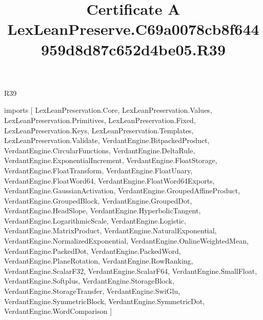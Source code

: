\begin{lexlean}{R39}
\title{Certificate A LexLeanPreserve.C69a0078cb8f644959d8d87c652d4be05.R39}
\begin{coremodule}
imports [
  LexLeanPreservation.Core,
  LexLeanPreservation.Values,
  LexLeanPreservation.Primitives,
  LexLeanPreservation.Fixed,
  LexLeanPreservation.Keys,
  LexLeanPreservation.Templates,
  LexLeanPreservation.Validate,
  VerdantEngine.BitpackedProduct,
  VerdantEngine.CircularFunctions,
  VerdantEngine.DeltaRule,
  VerdantEngine.ExponentialIncrement,
  VerdantEngine.FloatStorage,
  VerdantEngine.FloatTransform,
  VerdantEngine.FloatUnary,
  VerdantEngine.FloatWord64,
  VerdantEngine.FloatWord64Exports,
  VerdantEngine.GaussianActivation,
  VerdantEngine.GroupedAffineProduct,
  VerdantEngine.GroupedBlock,
  VerdantEngine.GroupedDot,
  VerdantEngine.HeadSlope,
  VerdantEngine.HyperbolicTangent,
  VerdantEngine.LogarithmicScale,
  VerdantEngine.Logistic,
  VerdantEngine.MatrixProduct,
  VerdantEngine.NaturalExponential,
  VerdantEngine.NormalizedExponential,
  VerdantEngine.OnlineWeightedMean,
  VerdantEngine.PackedDot,
  VerdantEngine.PackedWord,
  VerdantEngine.PlaneRotation,
  VerdantEngine.RowRanking,
  VerdantEngine.ScalarF32,
  VerdantEngine.ScalarF64,
  VerdantEngine.SmallFloat,
  VerdantEngine.Softplus,
  VerdantEngine.StorageBlock,
  VerdantEngine.StorageTransfer,
  VerdantEngine.SwiGlu,
  VerdantEngine.SymmetricBlock,
  VerdantEngine.SymmetricDot,
  VerdantEngine.WordComparison
]


\end{coremodule}
\end{lexlean}
